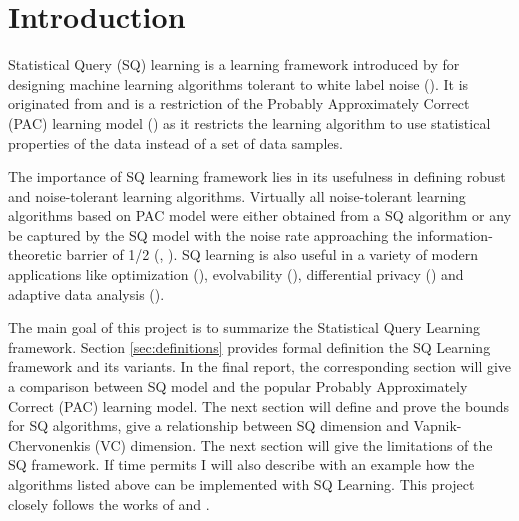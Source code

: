 \section{Introduction}
Statistical Query (SQ) learning is a learning framework introduced by \cite{kearns_efficient_1998} for designing machine learning algorithms tolerant to white label noise (\cite{angluin_learning_1988}). It is originated from and is a restriction of the Probably Approximately Correct (PAC) learning model (\cite{valiant_theory_1984}) as it restricts the learning algorithm to use statistical properties of the data instead of a set of data samples.

The importance of SQ learning framework lies in its usefulness in defining robust and noise-tolerant learning algorithms. Virtually all noise-tolerant learning algorithms based on PAC model were either obtained from a SQ algorithm or any be captured by the SQ model with the noise rate approaching the information-theoretic barrier of 1/2 (\cite{kearns_efficient_1998}, \cite{feldman_statistical_2008}). SQ learning is also useful in a variety of modern applications like optimization (\cite{feldman_statistical_2017}), evolvability (\cite{feldman_evolvability_2008}), differential privacy (\cite{dwork_calibrating_2006}) and adaptive data analysis (\cite{dwork_reusable_2015}).



The main goal of this project is to summarize the Statistical Query Learning framework. Section \ref{sec:definitions} provides formal definition the SQ Learning framework and its variants. In the final report, the corresponding section will give a comparison between SQ model and the popular Probably Approximately Correct (PAC) learning model. The next section will define and prove the bounds for SQ algorithms, give a relationship between SQ dimension and Vapnik-Chervonenkis (VC) dimension. The next section will give the limitations of the SQ framework. If time permits I will also describe with an example how the algorithms listed above can be implemented with SQ Learning. This project closely follows the works of \citet{reyzin_statistical_2020} and \citet{feldman_statistical_2008}.

